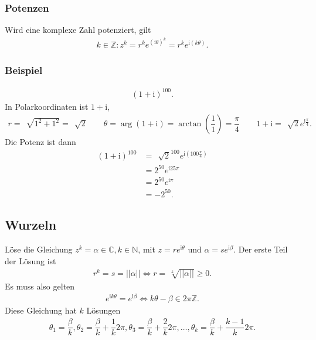 \documentclass[a4paper,12pt]{article}
\numberwithin{equation}{section}
\begin{document}
\subsubsection{Potenzen}
Wird eine komplexe Zahl potenziert, gilt
\begin{align} 
        k \in \mathbb{Z}:z^k=r^ke^{\left(\text{i}\theta \right)^k}=r^ke^{\text{i}\left(k\theta \right)}
.\end{align} 

\subsubsection{Beispiel}
\begin{align} 
        \left(1+\text{i}\right)^{100}
.\end{align} 
In Polarkoordinaten ist $1+\text{i}$, 
\begin{align} 
        r=\,\sqrt[]{1^2+1^2}=\,\sqrt[]{2}\qquad \theta =\arg\left(1+\text{i}\right)=\arctan\left(\dfrac{1}{1}\right)=\dfrac{\pi }{4}\qquad 1+\text{i}=\,\sqrt[]{2}e^{\text{i}\tfrac{\pi }{4}}
.\end{align} 
Die Potenz ist dann
\begin{align} 
        \left(1+\text{i}\right)^{100}&=\,\sqrt[]{2}^{100}e^{\text{i}\left(100\tfrac{\pi }{4}\right)}\nonumber \\
                                     &=2^{50}e^{\text{i}25\pi }\nonumber \\
                                     &=2^{50}e^{\text{i}\pi }\nonumber \\ 
                                     &=-2^{50}
.\end{align} 

\subsection{Wurzeln}
Löse die Gleichung $z^k=\alpha  \in \mathbb{C},k \in \mathbb{N}$, mit $z=re^{\text{i}\theta }$ und $\alpha =se^{\text{i}\beta }$. Der erste Teil der Lösung ist
\begin{align} 
        r^k=s=||\alpha || \Leftrightarrow r=\,\sqrt[k]{||\alpha || }\geq 0
.\end{align} 
Es muss also gelten
\begin{align} 
        e^{\text{i}k\theta }=e^{\text{i}\beta }\Leftrightarrow k\theta -\beta  \in 2\pi \mathbb{Z}
.\end{align} 
Diese Gleichung hat $k$ Lösungen
\begin{align} 
        \theta _1=\dfrac{\beta }{k},\theta _2=\dfrac{\beta }{k}+\dfrac{1}{k}2\pi ,\theta _3=\dfrac{\beta }{k}+\dfrac{2}{k}2\pi ,\hdots ,\theta _k=\dfrac{\beta }{k}+\dfrac{k-1}{k}2\pi 
.\end{align} 
\end{document}
